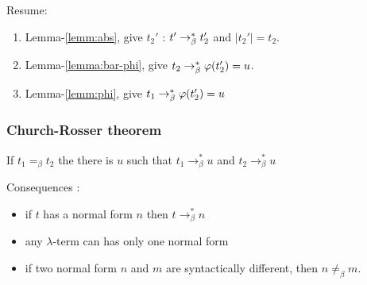     Resume:
    \begin{enumerate}
      \item Lemma-\ref{lemm:abs}, give $t_2'$ : $t' \to_\beta^* t_2'$ and $|t_2'| =
        t_2$.
      \item Lemma-\ref{lemma:bar-phi}, give $t_2 \to_\beta^* \varphi(t_2') = u$.
      \item Lemma-\ref{lemm:phi}, give $t_1 \to_\beta^* \varphi(t_2') = u$
    \end{enumerate}

  \qedsymbol


  \subsubsection{Church-Rosser theorem}

  If $t_1 =_\beta t_2$ the there is $u$ such that $t_1 \to_\beta^* u$ and $t_2
  \to_\beta^* u$

  Consequences :

  \begin{itemize}
    \item if $t$ has a normal form $n$ then $t \to_\beta^* n$

    \item any $\lambda$-term can has only one normal form

    \item if two normal form $n$ and $m$ are syntactically different, then $n
      \not =_\beta m$.
  \end{itemize}


